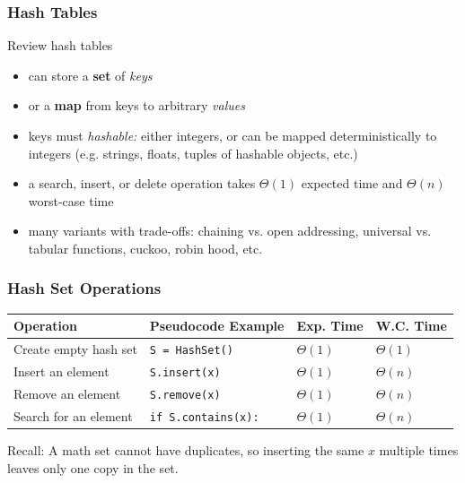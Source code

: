 \documentclass[10pt]{beamer}
\begin{document}
\begin{frame} \frametitle{Hash Tables}
Review hash tables
\begin{itemize}
  \item can store a \textbf{set} of \emph{keys}
  \item or a \textbf{map} from keys to arbitrary \emph{values}
  \item keys must \emph{hashable:} either integers, or can be mapped deterministically
    to integers (e.g. strings, floats, tuples of hashable objects, etc.)
  \item a search, insert, or delete operation takes $\Theta(1)$ expected time and
    $\Theta(n)$ worst-case time
  \item many variants with trade-offs: chaining vs. open addressing, universal vs.
    tabular functions, cuckoo, robin hood, etc.
\end{itemize}
\end{frame}

\begin{frame} \frametitle{Hash Set Operations}
  \begin{center}
    \begin{tabular}{llll}
      \textbf{Operation} & \textbf{Pseudocode Example} & \textbf{Exp. Time} & \textbf{W.C. Time} \\ \hline
      Create empty hash set & \texttt{S = HashSet()} & $\Theta(1)$ & $\Theta(1)$ \\
      Insert an element & \texttt{S.insert(x)} & $\Theta(1)$ & $\Theta(n)$ \\
      Remove an element & \texttt{S.remove(x)} & $\Theta(1)$ & $\Theta(n)$ \\
      Search for an element & \texttt{if S.contains(x):} & $\Theta(1)$ & $\Theta(n)$ \\
    \end{tabular}
  \end{center}

  \vspace{12pt}
  Recall: A math set cannot have duplicates, so inserting the same $x$ multiple times leaves only one copy in the set.
\end{frame}
\end{document}

